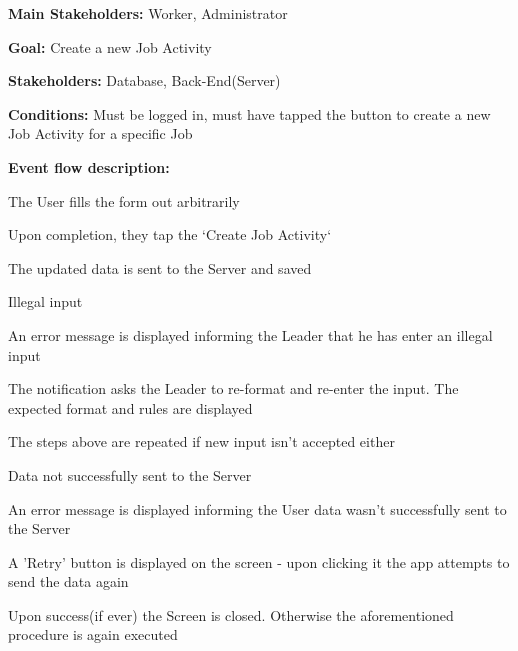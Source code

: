 			\noindent {}
			\begin{packed_item}
				\item \textbf{Main Stakeholders:} Worker, Administrator
				\item \textbf{Goal:} Create a new Job Activity
				\item \textbf{Stakeholders: } Database, Back-End(Server)
				\item \textbf{Conditions: } Must be logged in, must have tapped the button to create a new Job Activity for a specific Job
				\item \textbf{Event flow description: }
				\begin{packed_enum}
					\item The User fills the form out arbitrarily
					\item Upon completion, they tap the `Create Job Activity`
					\item The updated data is sent to the Server and saved
				\end{packed_enum}
				
				\begin{packed_item}
					\item[1.a] Illegal input
					\item[] \begin{packed_enum}
						\item An error message is displayed informing the Leader that he has enter an illegal input
						\item The notification asks the Leader to re-format and re-enter the input. The expected format and rules are displayed
						\item The steps above are repeated if new input isn't accepted either
					\end{packed_enum}
					
					\item[3.a] Data not successfully sent to the Server
					\item[] \begin{packed_enum}
						\item An error message is displayed informing the User data wasn't successfully sent to the Server
						\item A 'Retry' button is displayed on the screen - upon clicking it the app attempts to send the data again
						\item Upon success(if ever) the Screen is closed. Otherwise the aforementioned procedure is again executed
					\end{packed_enum}
				\end{packed_item}
			\end{packed_item}
			

